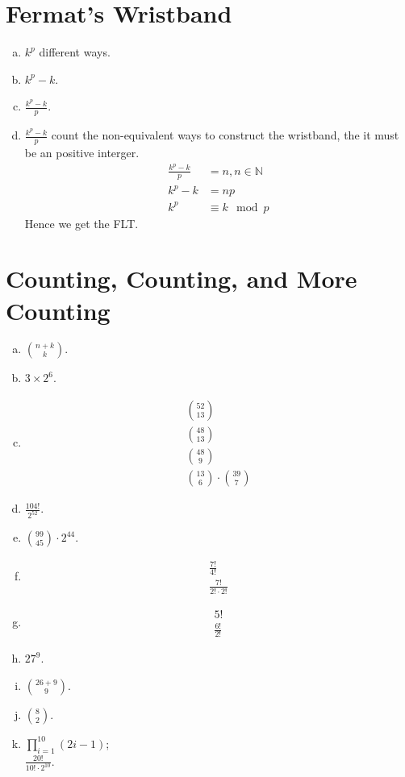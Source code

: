 \documentclass{article}
\begin{document}
\part*{Fermat's Wristband}
\begin{enumerate}[(a)]
    \item $k^p$ different ways.
    \item $k^p - k$.
    \item $\frac{k^p-k}{p}$.
    \item $\frac{k^p-k}{p}$ count the non-equivalent ways to construct the wristband, the it must be an positive interger. \\
    \begin{align*}
        \frac{k^p-k}{p} &= n, n \in \mathbb{N}\\
        k^p - k &= np\\
        k^p &\equiv k \mod{p}
    \end{align*}
    Hence we get the FLT.
\end{enumerate}    

\part*{Counting, Counting, and More Counting}
\begin{enumerate}[(a)]
    \item $\binom{n+k}{k}$.
    \item $3 \times 2^6$.
    \item \begin{align}
        \binom{52}{13}\\
        \binom{48}{13}\\
        \binom{48}{9}\\
        \binom{13}{6} \cdot \binom{39}{7}
    \end{align}
    \item $\frac{104!}{2^{52}}$.
    \item $\binom{99}{45} \cdot 2^{44}$.
    \item \begin{align}
        \frac{7!}{4!}\\
        \frac{7!}{2! \cdot 2!}
    \end{align}
    \item \begin{align}
        5!\\
        \frac{6!}{2!}
    \end{align}
    \item $27^9$.
    \item $\binom{26+9}{9}$.
    \item $\binom{8}{2}$.
    \item $\prod_{i=1}^{10}(2i-1)$; \\
    
    $\frac{20!}{10! \cdot 2^10}$.
\end{enumerate}
\end{document}
